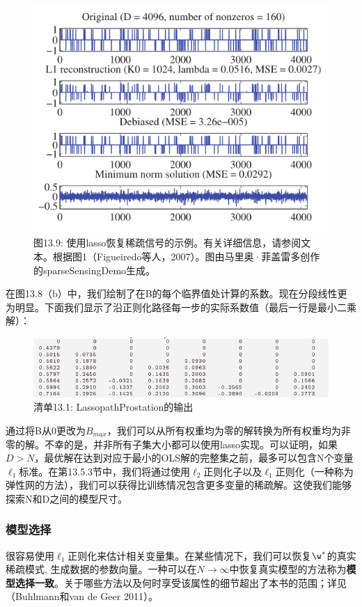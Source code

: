 \documentclass[a4paper]{article}
\begin{document}
\begin{figure}[h]
	\centering
	\includegraphics[width=0.7\linewidth]{fig13/figure9}
	\caption*{图13.9: 使用lasso恢复稀疏信号的示例。有关详细信息，请参阅文本。根据图1（Figueiredo等人，2007）。图由马里奥·菲盖雷多创作的sparseSensingDemo生成。}
\end{figure}

在图13.8（b）中，我们绘制了在B的每个临界值处计算的系数。现在分段线性更为明显。下面我们显示了沿正则化路径每一步的实际系数值（最后一行是最小二乘解）：

\begin{figure}[h]
	\centering
	\caption*{清单13.1: LassopathProstation的输出}
	\includegraphics[width=0.7\linewidth]{fig13/list1}
\end{figure}

通过将B从0更改为$B_{max}$，我们可以从所有权重均为零的解转换为所有权重均为非零的解。不幸的是，并非所有子集大小都可以使用lasso实现。可以证明，如果$D>N$，最优解在达到对应于最小的OLS解的完整集之前，最多可以包含N个变量$\ell_1$标准。在第13.5.3节中，我们将通过使用$\ell_2$正则化子以及$\ell_1$正则化（一种称为弹性网的方法），我们可以获得比训练情况包含更多变量的稀疏解。这使我们能够探索N和D之间的模型尺寸。
\clearpage
\subsubsection{模型选择}
很容易使用$\ell_1$正则化来估计相关变量集。在某些情况下，我们可以恢复$\w^*$的真实稀疏模式, 生成数据的参数向量。一种可以在$N\to \infty$中恢复真实模型的方法称为\textbf{模型选择一致}。关于哪些方法以及何时享受该属性的细节超出了本书的范围；详见（Buhlmann和van de Geer 2011）。
\end{document}
